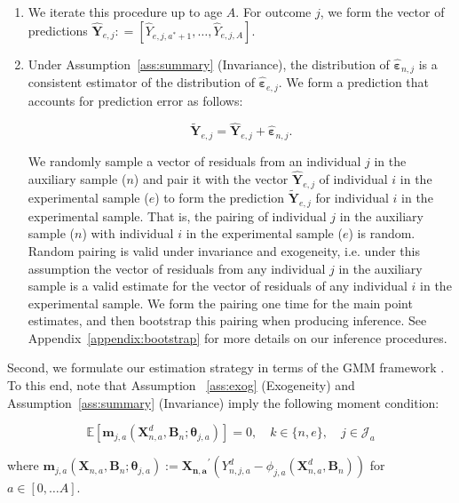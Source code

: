 \begin{enumerate}
\item We iterate this procedure up to age $A$. For outcome $j$, we form the vector of predictions $\hat{\bm{Y}}_{e,j} : = \left[ \hat{Y}_{e,j,a^*+1}, \ldots,  \hat{Y}_{e,j,A} \right]$.

\item Under Assumption~\ref{ass:summary} (Invariance), the distribution of $\hat{\bm{\varepsilon}}_{n,j}$ is a consistent estimator of the distribution of $\hat{\bm{\varepsilon}}_{e,j}$. We form a prediction that accounts for prediction error as follows:

\begin{equation}
\tilde{\bm{Y}}_{e,j} = \hat{\bm{Y}}_{e,j} + \hat{\bm{\varepsilon}}_{n,j}.
\end{equation}

\noindent We randomly sample a vector of residuals from an individual $j$ in the auxiliary sample ($n$) and pair it with the vector $\hat{\bm{Y}}_{e,j}$ of individual $i$ in the experimental sample ($e$) to form the prediction $\tilde{\bm{Y}}_{e,j}$ for individual $i$ in the experimental sample. That is, the pairing of individual $j$ in the auxiliary sample ($n$) with individual $i$ in the experimental sample ($e$) is random. Random pairing is valid under invariance and exogeneity, i.e. under this assumption the vector of residuals from any individual $j$ in the auxiliary sample is a valid estimate for the vector of residuals of any individual $i$ in the experimental sample. We form the pairing one time for the main point estimates, and then bootstrap this pairing when producing inference. See Appendix~\ref{appendix:bootstrap} for more details on our inference procedures.
\end{enumerate}

\noindent Second, we formulate our estimation strategy in terms of the GMM framework \citep{Hansen_1982_Econometrica}. To this end, note that Assumption ~\ref{ass:exog} (Exogeneity) and Assumption~\ref{ass:summary} (Invariance) imply the following moment condition:

\begin{equation}
\mathbb{E} \left[ \bm{m}_{j,a} \left( \bm{X}_{n,a}^d, \bm{B}_{n}; \bm{\theta}_{j,a} \right) \right] = 0,  \quad k \in \{n,e\}, \quad j \in \mathcal{J}_a \label{eq:moment}
\end{equation}

\noindent where $\bm{m}_{j,a} \left( \bm{X}_{n,a}, \bm{B}_{n} ; \bm{\theta}_{j,a} \right) := {\bm{X_{n,a}}}^{'} \left( Y_{n,j,a}^d -   \phi_{j,a} \left( \bm{X}_{n,a}^d, \bm{B}_{n} \right) \right)$ for $a \in [0, \ldots A]$.\\

